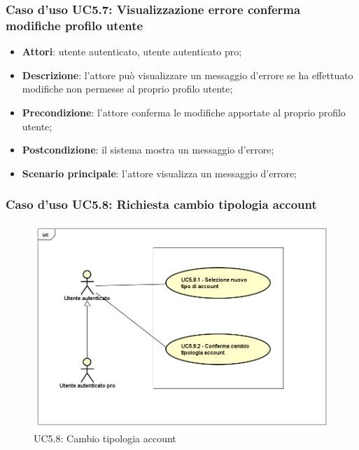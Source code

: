 \subsubsection{Caso d'uso UC5.7: Visualizzazione errore conferma modifiche profilo utente}

\begin{itemize}
	\item \textbf{Attori}:  utente autenticato, utente autenticato pro;
	\item \textbf{Descrizione}: l'attore può visualizzare un messaggio d'errore se ha effettuato modifiche non permesse al proprio profilo utente;
	\item \textbf{Precondizione}: l'attore conferma le modifiche apportate al proprio profilo utente;
	\item \textbf{Postcondizione}: il sistema mostra un messaggio d'errore;
	\item \textbf{Scenario principale}: l'attore visualizza un messaggio d'errore;
\end{itemize}

\subsubsection{Caso d'uso UC5.8: Richiesta cambio tipologia account}
\label{UC5.8}
\begin{figure}[h]
	\centering
	\includegraphics[scale=0.5,keepaspectratio]{UML/UC5_8.png}
	\caption{UC5.8: Cambio tipologia account}
\end{figure}

